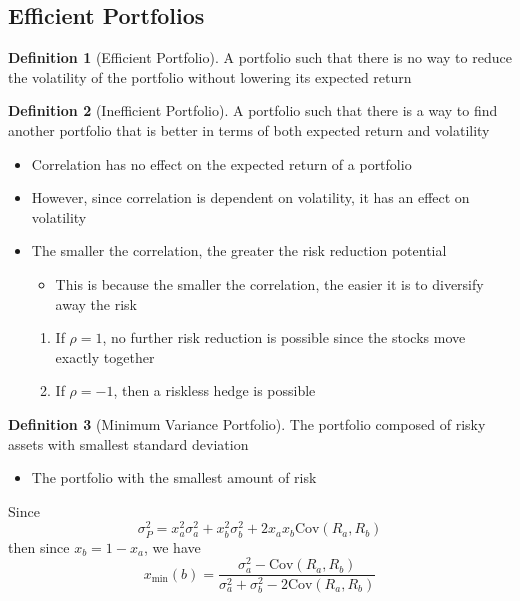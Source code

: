 \documentclass[11pt]{article}
\theoremstyle{definition}
\newtheorem*{definition}{Definition}
\newcommand{\Cov}{\text{Cov}}
\begin{document}
\subsection{Efficient Portfolios}
\begin{definition}[Efficient Portfolio]
    A portfolio such that there is no way to reduce the volatility of the portfolio without lowering its expected return
\end{definition}
\begin{definition}[Inefficient Portfolio]
    A portfolio such that there is a way to find another portfolio that is better in terms of both expected return and volatility
\end{definition}
\begin{itemize}
    \item Correlation has no effect on the expected return of a portfolio
    \item However, since correlation is dependent on volatility, it has an effect on volatility
    \item The smaller the correlation, the greater the risk reduction potential
    \begin{itemize}
        \item This is because the smaller the correlation, the easier it is to diversify away the risk
    \end{itemize}
    \begin{enumerate}
        \item If $\rho = 1$, no further risk reduction is possible since the stocks move exactly together
        \item If $\rho = -1$, then a riskless hedge is possible
    \end{enumerate}
\end{itemize}

\begin{definition}[Minimum Variance Portfolio]
    The portfolio composed of risky assets with smallest standard deviation
    \begin{itemize}
        \item The portfolio with the smallest amount of risk
    \end{itemize}
\end{definition}
Since 
\begin{equation*}
    \sigma_P^2 = x_a^2\sigma_a^2 + x_b^2\sigma_b^2 + 2x_ax_b\Cov(R_a, R_b)
\end{equation*}
then since $x_b = 1 - x_a$, we have 
\begin{equation*}
    x_{\min}(b) = \frac{\sigma_a^2 - \Cov(R_a, R_b)}{\sigma_a^2 + \sigma_b^2 - 2\Cov(R_a, R_b)}
\end{equation*}
\end{document}
